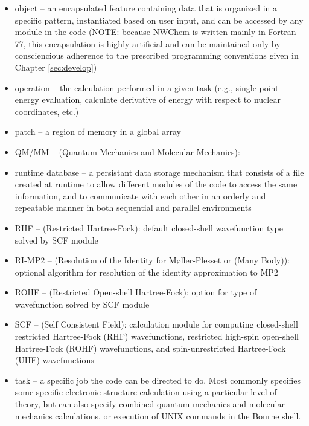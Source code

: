 \begin{itemize}
\item object -- an encapsulated feature containing data that is organized
in a specific pattern, instantiated based on user input,
and can be accessed by any module in the code (NOTE:
because NWChem is written mainly in Fortran-77, this encapsulation is
highly artificial and can be maintained only by consciencious adherence
to the prescribed programming conventions given in Chapter \ref{sec:develop})

\item operation -- the calculation performed in a given task (e.g., single
point energy evaluation, calculate derivative of energy with respect to
nuclear coordinates, etc.)

\item patch -- a region of memory in a global array

\item QM/MM -- (Quantum-Mechanics and Molecular-Mechanics):

\item runtime database -- a persistant data storage mechanism that consists of
a file created at runtime to allow different
modules of the code to access the same information, and to communicate
with each other in an orderly and repeatable manner in both sequential
and parallel environments

\item RHF -- (Restricted Hartree-Fock): default closed-shell wavefunction type 
solved by SCF module

\item RI-MP2 -- (Resolution of the Identity for M{\o}ller-Plesset or (Many
Body)): optional algorithm for resolution
of the identity approximation to MP2

\item ROHF -- (Restricted Open-shell Hartree-Fock): option for type of wavefunction
solved by SCF module

\item SCF -- (Self Consistent Field): calculation module for computing 
closed-shell restricted Hartree-Fock (RHF) wavefunctions, restricted 
high-spin open-shell Hartree-Fock (ROHF) wavefunctions,
and spin-unrestricted Hartree-Fock (UHF) wavefunctions

\item task -- a specific job the code can be directed to do.  Most commonly
specifies some specific electronic structure calculation using a particular 
level of theory, but can also specify combined quantum-mechanics and molecular-
mechanics calculations, or execution of UNIX commands in the Bourne shell.


\end{itemize}
